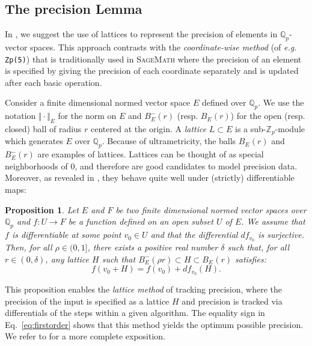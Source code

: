 \documentclass[sigconf]{acmart}
\newcommand{\Z}{\mathbb Z}
\newcommand{\Zp}{\Z_p}
\newcommand{\Q}{\mathbb Q}
\newcommand{\Qp}{\Q_p}
\newcommand{\sage}{\textsc{SageMath}\xspace}
\newtheorem{prop}[theo]{Proposition}
\theoremstyle{definition}
\begin{document}
\subsection{The precision Lemma}
\label{ssec:preclemma}

In \cite{caruso-roe-vaccon:14a}, we suggest the 
use of lattices to represent the precision of elements in 
$\Qp$-vector spaces.  This approach contrasts with the
\emph{coordinate-wise method} (of \textit{e.g.}
 \verb?Zp(5)?) that is traditionally used in \sage
where the precision of an element is specified by giving the precision
of each coordinate separately and is updated after each basic
operation.

Consider a finite dimensional normed vector space $E$ defined over 
$\Qp$. We use the notation $\Vert \cdot \Vert_E$ for the norm on $E$ and 
$B^-_E(r)$ (resp. $B^{\phantom -}_E(r)$) for the open (resp. closed) 
ball of radius $r$ centered at the origin. A \emph{lattice} $L \subset 
E$ is a sub-$\Zp$-module which generates $E$ over $\Qp$. Because of 
ultrametricity, the balls $B^{\phantom -}_E(r)$ and $B^-_E(r)$ are 
examples of lattices. Lattices can be thought of as special 
neighborhoods of $0$, and therefore are good candidates to model 
precision data. Moreover, as revealed in \cite{caruso-roe-vaccon:14a}, 
they behave quite well under (strictly) differentiable maps:

\begin{prop}
\label{prop:precision}
Let $E$ and $F$ be two finite dimensional normed vector spaces over $\Qp$ 
and $f : U \rightarrow F$ be a function defined on an open subset $U$ of 
$E$. We assume that $f$ is differentiable at some point $v_0 \in U$ and 
that the differential $df_{v_0}$ is surjective.
Then, for all $\rho \in (0, 1]$, there exists a positive real
number $\delta$ such that, for all $r \in (0, \delta)$, any lattice
$H$ such that $B^-_E(\rho r) \subset H \subset B^{\phantom -}_E(r)$ 
satisfies:
\begin{equation}
\label{eq:firstorder}
f(v_0 + H) = f(v_0) + df_{v_0} (H).
\end{equation}
\end{prop}

This proposition enables the \emph{lattice method} of tracking precision,
where the precision of the input is specified as a lattice $H$ and precision
is tracked via differentials of the steps within a given algorithm.
The equality sign in Eq.~\eqref{eq:firstorder} shows that this method
yields the optimum possible precision. 
We refer to \cite[\S 4.1]{caruso-roe-vaccon:14a} for a more complete 
exposition.
\end{document}
